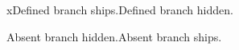 \documentclass{article}
\newcommand{\probedefined}{x}
\begin{document}
\ifdefined\probedefined Defined branch ships.\else Defined branch hidden.\fi

\ifdefined\probeabsent Absent branch hidden.\else Absent branch ships.\fi
\end{document}
